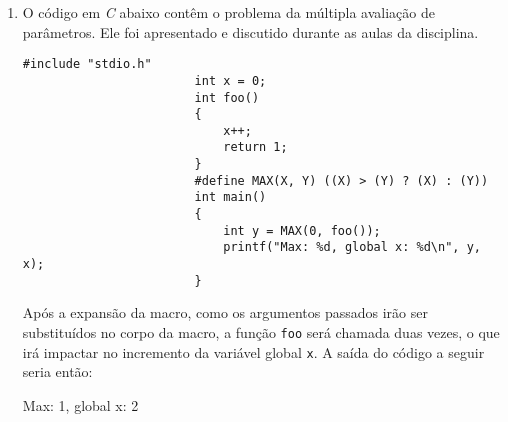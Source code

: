 \documentclass{article}
\begin{document}
\begin{enumerate}
\begin{enumerate}[label = (\alph*)]
                    \begin{lstlisting}[style=CStyle]
                        #include "stdio.h"
                        #define SWAP(X, Y)   \
                            {                \
                                int tmp = X; \
                                X = Y;       \
                                Y = tmp;     \
                            }
                        int main()
                        {
                            int a = 2;
                            int tmp = 15;
                            printf("Before: %d, %d\n", a, tmp);
                            {
                                int tmp = a;
                                a = tmp;
                                tmp = tmp;
                            }
                            printf("After: %d, %d\n", a, tmp);
                        }
                    \end{lstlisting}
              \item
                    O código em \textit{C} abaixo contêm o problema da múltipla
                    avaliação de parâmetros. Ele foi apresentado e
                    discutido durante as aulas da disciplina.

                    \begin{lstlisting}[style=CStyle]
                        #include "stdio.h"
                        int x = 0;
                        int foo()
                        {
                            x++;
                            return 1;
                        }
                        #define MAX(X, Y) ((X) > (Y) ? (X) : (Y))
                        int main()
                        {
                            int y = MAX(0, foo());
                            printf("Max: %d, global x: %d\n", y, x);
                        }
                    \end{lstlisting}

                    Após a expansão da macro, como os argumentos passados irão
                    ser substituídos no corpo da
                    macro, a função \texttt{foo} será chamada duas vezes, o que
                    irá impactar no incremento da variável
                    global \texttt{x}. A saída do código a seguir seria então:

                    Max: 1, global x: 2
          \end{enumerate}


\end{enumerate}
\end{document}
